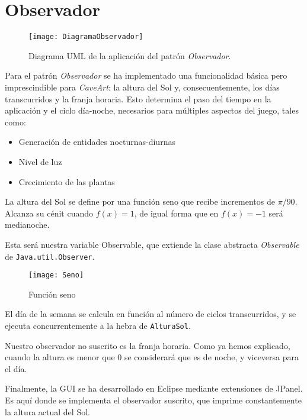 \section{Observador}

\begin{figure}[ht!]
\begin{center}
	\texttt{[image: DiagramaObservador]}
\end{center}
\caption{Diagrama UML de la aplicación del patrón \textit{Observador}.}
\end{figure}

Para el patrón \textit{Observador} se ha implementado una funcionalidad básica pero imprescindible para \textit{CaveArt}: la altura del Sol y, consecuentemente, los días transcurridos y la franja horaria. Esto determina el paso del tiempo en la aplicación y el ciclo día-noche, necesarios para múltiples aspectos del juego, tales como:

\begin{itemize}
	\item Generación de entidades nocturnas-diurnas
	\item Nivel de luz
	\item Crecimiento de las plantas
\end{itemize}

La altura del Sol se define por una función seno que recibe incrementos de $\pi/90$. Alcanza su cénit cuando $f(x)=1$, de igual forma que en $f(x)=-1$ será medianoche.

Esta será nuestra variable Observable, que extiende la clase abstracta \textit{Observable} de \texttt{Java.util.Observer}.

\begin{figure}[ht!]
\begin{center}
	\texttt{[image: Seno]}
\end{center}
\caption{Función seno}
\end{figure}

El día de la semana se calcula en función al número de ciclos transcurridos, y se ejecuta concurrentemente a la hebra de \texttt{AlturaSol}.

Nuestro observador no suscrito es la franja horaria. Como ya hemos explicado, cuando la altura es menor que 0 se considerará que es de noche, y viceversa para el día.

Finalmente, la GUI se ha desarrollado en Eclipse mediante extensiones de JPanel. Es aquí donde se implementa el observador suscrito, que imprime constantemente la altura actual del Sol.
